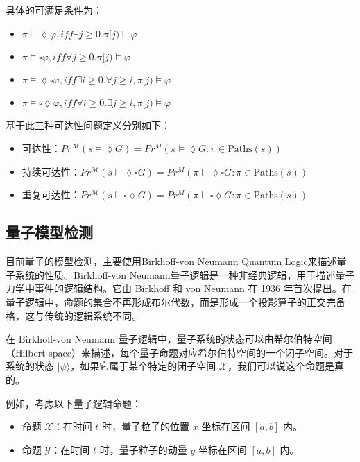 具体的可满足条件为：
\begin{itemize}
    \item \(\pi\models\lozenge\varphi,iff\exists j\ge0.\pi[j)\models\varphi\)
    \item \(\pi\models\square\varphi,iff\forall j\ge 0.\pi[j)\models\varphi\)
    \item \(\pi\models\lozenge\square\varphi,iff\exists i\ge 0.\forall j\ge i,\pi[j)\models\varphi\)
    \item \(\pi\models\square\lozenge\varphi,iff\forall i\ge 0.\exists j\ge i,\pi[j)\models\varphi\)
\end{itemize}
基于此三种可达性问题定义分别如下：
\begin{itemize}
    \item 可达性：\( Pr^{\mathcal{M}}(s \models \lozenge G) = Pr^M(\pi \models \lozenge G : \pi \in \text{Paths}(s))\)
    \item 持续可达性：\( Pr^{\mathcal{M}}(s \models \lozenge \square G) = Pr^M(\pi \models \lozenge \square G : \pi \in \text{Paths}(s))\)
    \item 重复可达性：\( Pr^{\mathcal{M}}(s \models\square \lozenge G) = Pr^M(\pi \models \square\lozenge G : \pi \in \text{Paths}(s))\)
\end{itemize}
\subsection{量子模型检测}
目前量子的模型检测，主要使用Birkhoff-von Neumann Quantum Logic来描述量子系统的性质\citep{birkhoff1987logic}。Birkhoff-von Neumann量子逻辑是一种非经典逻辑，用于描述量子力学中事件的逻辑结构。它由 Birkhoff 和 von Neumann 在 1936 年首次提出。在量子逻辑中，命题的集合不再形成布尔代数，而是形成一个投影算子的正交完备格，这与传统的逻辑系统不同。

在 Birkhoff-von Neumann 量子逻辑中，量子系统的状态可以由希尔伯特空间（Hilbert space）来描述，每个量子命题对应希尔伯特空间的一个闭子空间。对于系统的状态 \(|\psi\rangle\)，如果它属于某个特定的闭子空间 \( \mathcal{X} \)，我们可以说这个命题是真的。

例如，考虑以下量子逻辑命题：

\begin{itemize}
\item 命题 \( \mathcal{X} \)：在时间 \( t \) 时，量子粒子的位置 \( x \) 坐标在区间 \( [a, b] \) 内。
\item 命题 \( \mathcal{Y} \)：在时间 \( t \) 时，量子粒子的动量 \( y \) 坐标在区间 \( [a, b] \) 内。
\end{itemize}

